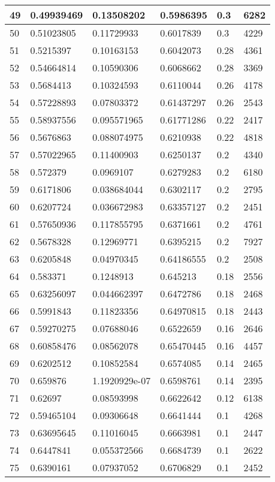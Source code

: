 \begin{longtable}{|l|l|l|l|l|l|}
49 & 0.49939469 & 0.13508202 & 0.5986395 & 0.3 & 6282 \\ \hline 
50 & 0.51023805 & 0.11729933 & 0.6017839 & 0.3 & 4229 \\ \hline 
51 & 0.5215397 & 0.10163153 & 0.6042073 & 0.28 & 4361 \\ \hline 
52 & 0.54664814 & 0.10590306 & 0.6068662 & 0.28 & 3369 \\ \hline 
53 & 0.5684413 & 0.10324593 & 0.6110044 & 0.26 & 4178 \\ \hline 
54 & 0.57228893 & 0.07803372 & 0.61437297 & 0.26 & 2543 \\ \hline 
55 & 0.58937556 & 0.095571965 & 0.61771286 & 0.22 & 2417 \\ \hline 
56 & 0.5676863 & 0.088074975 & 0.6210938 & 0.22 & 4818 \\ \hline 
57 & 0.57022965 & 0.11400903 & 0.6250137 & 0.2 & 4340 \\ \hline 
58 & 0.572379 & 0.0969107 & 0.6279283 & 0.2 & 6180 \\ \hline 
59 & 0.6171806 & 0.038684044 & 0.6302117 & 0.2 & 2795 \\ \hline 
60 & 0.6207724 & 0.036672983 & 0.63357127 & 0.2 & 2451 \\ \hline 
61 & 0.57650936 & 0.117855795 & 0.6371661 & 0.2 & 4761 \\ \hline 
62 & 0.5678328 & 0.12969771 & 0.6395215 & 0.2 & 7927 \\ \hline 
63 & 0.6205848 & 0.04970345 & 0.64186555 & 0.2 & 2508 \\ \hline 
64 & 0.583371 & 0.1248913 & 0.645213 & 0.18 & 2556 \\ \hline 
65 & 0.63256097 & 0.044662397 & 0.6472786 & 0.18 & 2468 \\ \hline 
66 & 0.5991843 & 0.11823356 & 0.64970815 & 0.18 & 2443 \\ \hline 
67 & 0.59270275 & 0.07688046 & 0.6522659 & 0.16 & 2646 \\ \hline 
68 & 0.60858476 & 0.08562078 & 0.65470445 & 0.16 & 4457 \\ \hline 
69 & 0.6202512 & 0.10852584 & 0.6574085 & 0.14 & 2465 \\ \hline 
70 & 0.659876 & 1.1920929e-07 & 0.6598761 & 0.14 & 2395 \\ \hline 
71 & 0.62697 & 0.08593998 & 0.6622642 & 0.12 & 6138 \\ \hline 
72 & 0.59465104 & 0.09306648 & 0.6641444 & 0.1 & 4268 \\ \hline 
73 & 0.63695645 & 0.11016045 & 0.6663981 & 0.1 & 2447 \\ \hline 
74 & 0.6447841 & 0.055372566 & 0.6684739 & 0.1 & 2622 \\ \hline 
75 & 0.6390161 & 0.07937052 & 0.6706829 & 0.1 & 2452 \\ \hline 
\end{longtable}